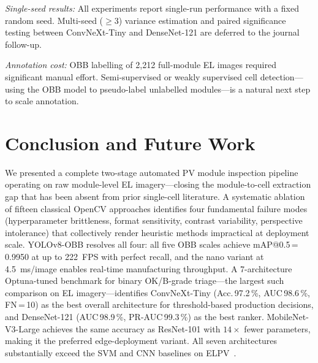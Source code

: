\documentclass[conference]{IEEEtran}
\begin{document}
\textit{Single-seed results:} All experiments report single-run performance with a fixed random seed. Multi-seed ($\geq$3) variance estimation and paired significance testing between ConvNeXt-Tiny and DenseNet-121 are deferred to the journal follow-up.

\textit{Annotation cost:} OBB labelling of 2{,}212 full-module EL images required significant manual effort. Semi-supervised or weakly supervised cell detection---using the OBB model to pseudo-label unlabelled modules---is a natural next step to scale annotation.

\section{Conclusion and Future Work}
\label{sec:conclusion}

We presented a complete two-stage automated PV module inspection pipeline operating on raw module-level EL imagery---closing the module-to-cell extraction gap that has been absent from prior single-cell literature. A systematic ablation of fifteen classical OpenCV approaches identifies four fundamental failure modes (hyperparameter brittleness, format sensitivity, contrast variability, perspective intolerance) that collectively render heuristic methods impractical at deployment scale. YOLOv8-OBB resolves all four: all five OBB scales achieve mAP@0.5\,=\,0.9950 at up to 222~FPS with perfect recall, and the nano variant at 4.5~ms/image enables real-time manufacturing throughput. A 7-architecture Optuna-tuned benchmark for binary OK/B-grade triage---the largest such comparison on EL imagery---identifies ConvNeXt-Tiny (Acc.\,97.2\,\%, AUC\,98.6\,\%, FN\,=\,10) as the best overall architecture for threshold-based production decisions, and DenseNet-121 (AUC\,98.9\,\%, PR-AUC\,99.3\,\%) as the best ranker. MobileNet-V3-Large achieves the same accuracy as ResNet-101 with $14\times$ fewer parameters, making it the preferred edge-deployment variant. All seven architectures substantially exceed the SVM and CNN baselines on ELPV~\cite{deitsch2019}.
\end{document}
